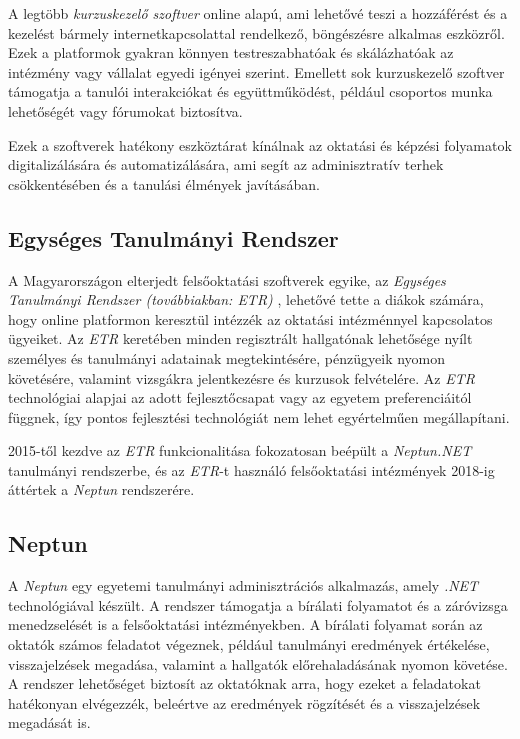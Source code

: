 A legtöbb \textit{kurzuskezelő szoftver} online alapú, ami lehetővé teszi a hozzáférést és a kezelést bármely internetkapcsolattal rendelkező, böngészésre alkalmas eszközről. Ezek a platformok gyakran könnyen testreszabhatóak és skálázhatóak az intézmény vagy vállalat egyedi igényei szerint. Emellett sok kurzuskezelő szoftver támogatja a tanulói interakciókat és együttműködést, például csoportos munka lehetőségét vagy fórumokat biztosítva.

Ezek a szoftverek hatékony eszköztárat kínálnak az oktatási és képzési folyamatok digitalizálására és automatizálására, ami segít az adminisztratív terhek csökkentésében és a tanulási élmények javításában.

\subsection{Egységes Tanulmányi Rendszer}

A Magyarországon elterjedt felsőoktatási szoftverek egyike, az \textit{Egységes Tanulmányi Rendszer (továbbiakban: ETR)} \cite{etr}, lehetővé tette a diákok számára, hogy online platformon keresztül intézzék az oktatási intézménnyel kapcsolatos ügyeiket. Az \textit{ETR} keretében minden regisztrált hallgatónak lehetősége nyílt személyes és tanulmányi adatainak megtekintésére, pénzügyeik nyomon követésére, valamint vizsgákra jelentkezésre és kurzusok felvételére. Az \textit{ETR} technológiai alapjai az adott fejlesztőcsapat vagy az egyetem preferenciáitól függnek, így pontos fejlesztési technológiát nem lehet egyértelműen megállapítani.

2015-től kezdve az \textit{ETR} funkcionalitása fokozatosan beépült a \textit{Neptun.NET} \cite{neptun} tanulmányi rendszerbe, és az \textit{ETR}-t használó felsőoktatási intézmények 2018-ig áttértek a \textit{Neptun} rendszerére.

\subsection{Neptun}

A \textit{Neptun} \cite{neptun} egy egyetemi tanulmányi adminisztrációs alkalmazás, amely \textit{.NET} \cite{.NET} technológiával készült.  A rendszer támogatja a bírálati folyamatot és a záróvizsga menedzselését is a felsőoktatási intézményekben. A bírálati folyamat során az oktatók számos feladatot végeznek, például tanulmányi eredmények értékelése, visszajelzések megadása, valamint a hallgatók előrehaladásának nyomon követése. A rendszer lehetőséget biztosít az oktatóknak arra, hogy ezeket a feladatokat hatékonyan elvégezzék, beleértve az eredmények rögzítését és a visszajelzések megadását is.

